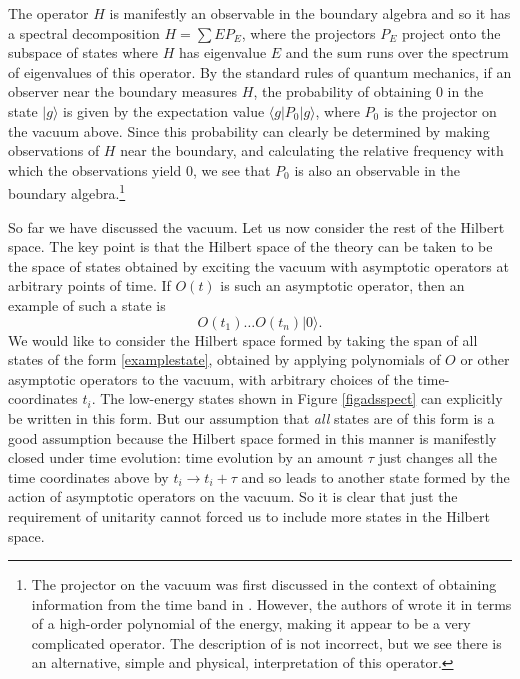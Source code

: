 \documentclass[12pt]{article}
\newcommand{\be}{\begin{equation}}
\newcommand{\ee}{\end{equation}}
\def\projvac{{\cal P}_{\Omega}}
\def\projvac{P_0}
\begin{document}
The operator $H$ is manifestly an observable in the boundary algebra and so it has a spectral decomposition $H = \sum E P_{E}$, where the projectors $P_{E}$ project onto the subspace of states where $H$ has eigenvalue $E$ and the sum runs over the spectrum of eigenvalues of this operator. By the standard rules of quantum mechanics, if an observer near the boundary measures $H$, the probability of obtaining $0$ in the state $|g \rangle$ is given by the expectation value $\langle g | \projvac | g \rangle$, where $\projvac$ is the projector on the vacuum above. Since this probability can clearly be determined by making observations of $H$ near the boundary, and calculating the relative frequency with which the observations yield $0$, we see that $\projvac$ is also an observable in the boundary algebra.\footnote{The projector on the vacuum was first discussed in the context of obtaining information from the time band in \cite{Banerjee:2016mhh}. However, the authors of \cite{Banerjee:2016mhh} wrote it in terms of a high-order polynomial of  the energy, making it appear to be a very complicated operator. The description of \cite{Banerjee:2016mhh} is not incorrect, but we see there is an alternative, simple and physical, interpretation of this operator.}

So far we have discussed the vacuum. Let us now consider the rest of the Hilbert space. The key point is that the Hilbert space of the theory can be taken to be the space of states obtained by exciting the vacuum with asymptotic operators
at arbitrary points of time. If $O(t)$ is such an asymptotic operator, then an example of such a state is 
\be
\label{examplestate}
O(t_1) \ldots O(t_n) | 0 \rangle.
\ee
We would like to consider the Hilbert space formed by taking the span of all states of the form \eqref{examplestate}, obtained by applying polynomials of $O$ or other asymptotic operators to the vacuum, with arbitrary choices of the time-coordinates $t_i$. The low-energy states shown in Figure \ref{figadsspect} can explicitly be written in this form. But our assumption that {\em all} states are of this form is a good assumption because the Hilbert space formed in this manner is manifestly closed under time evolution: time evolution by an amount $\tau$ just changes all the time coordinates above by $t_i \rightarrow t_i + \tau$ and so leads to another state formed by the action of asymptotic operators on the vacuum. So it is clear that just the requirement of unitarity cannot forced us to include more states in the Hilbert space.
\end{document}
